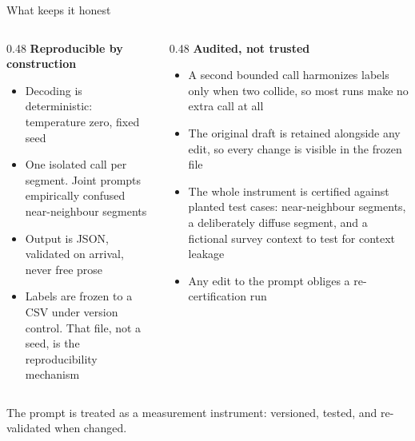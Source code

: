 \documentclass[
  ignorenonframetext,
  aspectratio=169,
]{beamer}
\newcommand{\kicker}[1]{\par\noindent{\footnotesize\color{vteal}\textbf{\MakeUppercase{#1}}}\par\vspace{0.4em}}
\begin{document}
\begin{frame}[shrink]{What keeps it honest}
\label{what-keeps-it-honest}
\kicker{guardrails}

\footnotesize

\begin{columns}[T]
\begin{column}{0.48\textwidth}
\textbf{Reproducible by construction}
\begin{itemize}\itemsep2pt
  \item Decoding is deterministic: temperature zero, fixed seed
  \item One isolated call per segment. Joint prompts empirically confused near-neighbour segments
  \item Output is JSON, validated on arrival, never free prose
  \item Labels are frozen to a CSV under version control. That file, not a seed, is the reproducibility mechanism
\end{itemize}
\end{column}
\begin{column}{0.48\textwidth}
\textbf{Audited, not trusted}
\begin{itemize}\itemsep2pt
  \item A second bounded call harmonizes labels only when two collide, so most runs make no extra call at all
  \item The original draft is retained alongside any edit, so every change is visible in the frozen file
  \item The whole instrument is certified against planted test cases: near-neighbour segments, a deliberately diffuse segment, and a fictional survey context to test for context leakage
  \item Any edit to the prompt obliges a re-certification run
\end{itemize}
\end{column}
\end{columns}

\vspace{0.6em}

\begin{center}
\colorbox{vteal!15}{\parbox{0.92\textwidth}{\centering
The prompt is treated as a measurement instrument: versioned, tested, and re-validated when changed.}}
\end{center}

\end{frame}
\end{document}
